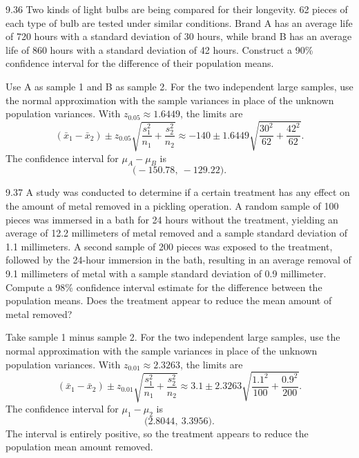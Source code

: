 \documentclass[11pt,oneside]{article}
\begin{document}
\begin{exercise}{9.36}
Two kinds of light bulbs are being compared for their longevity. 62 pieces of each type of bulb are tested under similar conditions. Brand A has an average life of 720 hours with a standard deviation of 30 hours, while brand B has an average life of 860 hours with a standard deviation of 42 hours. Construct a 90\% confidence interval for the difference of their population means.
\end{exercise}
\begin{solution}
Use A as sample 1 and B as sample 2. For the two independent large samples, use the normal approximation with the sample variances in place of the unknown population variances. With $z_{0.05}\approx1.6449$, the limits are
\[
(\bar x_1-\bar x_2)\pm z_{0.05}\sqrt{\frac{s_1^2}{n_1}+\frac{s_2^2}{n_2}}\approx -140\pm 1.6449\sqrt{\frac{30^2}{62}+\frac{42^2}{62}}.
\]
The confidence interval for $\mu_A-\mu_B$ is 
\[
\boxed{\bigl(-150.78,\ -129.22\bigr)}.
\]
\end{solution}

\begin{exercise}{9.37}
A study was conducted to determine if a certain treatment has any effect on the amount of metal removed in a pickling operation. A random sample of 100 pieces was immersed in a bath for 24 hours without the treatment, yielding an average of 12.2 millimeters of metal removed and a sample standard deviation of 1.1 millimeters. A second sample of 200 pieces was exposed to the treatment, followed by the 24-hour immersion in the bath, resulting in an average removal of 9.1 millimeters of metal with a sample standard deviation of 0.9 millimeter. Compute a 98\% confidence interval estimate for the difference between the population means. Does the treatment appear to reduce the mean amount of metal removed?
\end{exercise}
\begin{solution}
Take sample 1 minus sample 2. For the two independent large samples, use the normal approximation with the sample variances in place of the unknown population variances. With $z_{0.01}\approx2.3263$, the limits are
\[
(\bar x_1-\bar x_2)\pm z_{0.01}\sqrt{\frac{s_1^2}{n_1}+\frac{s_2^2}{n_2}}\approx 3.1\pm 2.3263\sqrt{\frac{1.1^2}{100}+\frac{0.9^2}{200}}.
\]
The confidence interval for $\mu_1-\mu_2$ is 
\[
\boxed{\bigl(2.8044,\ 3.3956\bigr)}.
\]
The interval is entirely positive, so the treatment appears to reduce the population mean amount removed.
\end{solution}
\end{document}
